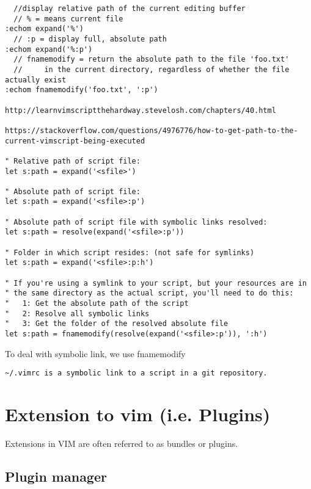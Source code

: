 \begin{verbatim} 
  //display relative path of the current editing buffer
  // % = means current file
:echom expand('%')
  // :p = display full, absolute path 
:echom expand('%:p')
  // fnamemodify = return the absolute path to the file 'foo.txt'
  //     in the current directory, regardless of whether the file actually exist
:echom fnamemodify('foo.txt', ':p')

http://learnvimscriptthehardway.stevelosh.com/chapters/40.html

https://stackoverflow.com/questions/4976776/how-to-get-path-to-the-current-vimscript-being-executed

" Relative path of script file:
let s:path = expand('<sfile>')

" Absolute path of script file:
let s:path = expand('<sfile>:p')

" Absolute path of script file with symbolic links resolved:
let s:path = resolve(expand('<sfile>:p'))

" Folder in which script resides: (not safe for symlinks)
let s:path = expand('<sfile>:p:h')

" If you're using a symlink to your script, but your resources are in
" the same directory as the actual script, you'll need to do this:
"   1: Get the absolute path of the script
"   2: Resolve all symbolic links
"   3: Get the folder of the resolved absolute file
let s:path = fnamemodify(resolve(expand('<sfile>:p')), ':h')
\end{verbatim}
To deal with symbolic link, we use fnamemodify
\begin{verbatim}
~/.vimrc is a symbolic link to a script in a git repository.
\end{verbatim}

\section{Extension to vim (i.e. Plugins)}


Extensions in VIM are often referred to as bundles or plugins.

\subsection{Plugin manager}



